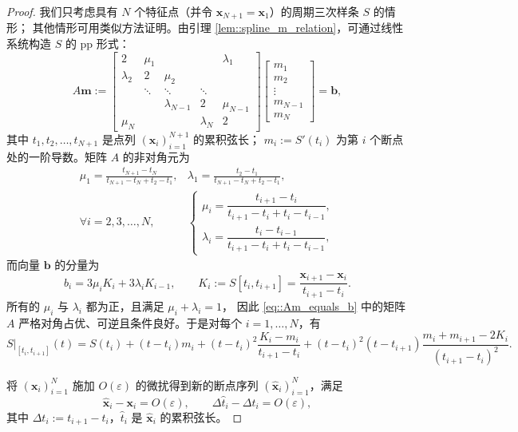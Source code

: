 \documentclass[a4paper]{ctexart}
\numberwithin{theorem}{section}
\numberwithin{equation}{section}
\numberwithin{figure}{section}
\numberwithin{remark}{section}
\begin{document}
\begin{proof}
我们只考虑具有 $N$ 个特征点（并令 $\mathbf{x}_{N+1}=\mathbf{x}_1$）的周期三次样条 $S$ 的情形；
其他情形可用类似方法证明。由引理 \ref{lem::spline_m_relation}，可通过线性系统构造 $S$ 的 pp 形式：
\begin{equation}
    \label{eq::Am_equals_b} 
A\mathbf{m}:=
\begin{bmatrix}
2 & \mu_1 &        &        & \lambda_1 \\
\lambda_2 & 2 & \mu_2 \\
 & \ddots & \ddots & \ddots \\
 &        & \lambda_{N-1} & 2 & \mu_{N-1} \\
\mu_N &     &        & \lambda_N & 2
\end{bmatrix}
\begin{bmatrix}
m_1 \\ m_2 \\ \vdots \\ m_{N-1} \\ m_N
\end{bmatrix}
=\mathbf{b},
\end{equation}
其中 $t_1,t_2,\ldots,t_{N+1}$ 是点列 $(\mathbf{x}_i)_{i=1}^{N+1}$ 的累积弦长；
$m_i:=S'(t_i)$ 为第 $i$ 个断点处的一阶导数。矩阵 $A$ 的非对角元为
\[
\begin{aligned}
\mu_1=\frac{t_{N+1}-t_N}{t_{N+1}-t_N+t_2-t_1},
& \lambda_1=\frac{t_2-t_1}{t_{N+1}-t_N+t_2-t_1},\\
\forall i=2,3,\ldots,N,\ 
& \begin{cases}
\mu_i=\dfrac{t_{i+1}-t_i}{t_{i+1}-t_i+t_i-t_{i-1}},\\[6pt]
\lambda_i=\dfrac{t_i-t_{i-1}}{t_{i+1}-t_i+t_i-t_{i-1}},
\end{cases}
\end{aligned}
\]
而向量 $\mathbf{b}$ 的分量为
\[
b_i=3\mu_i K_i+3\lambda_i K_{i-1},\qquad
K_i:=S[t_i,t_{i+1}]=\frac{\mathbf{x}_{i+1}-\mathbf{x}_i}{t_{i+1}-t_i}.
\]
所有的 $\mu_i$ 与 $\lambda_i$ 都为正，且满足 $\mu_i+\lambda_i=1$，
因此 \eqref{eq::Am_equals_b} 中的矩阵 $A$ 严格对角占优、可逆且条件良好。于是对每个 $i=1,\ldots,N$，有
\begin{equation}
    \label{eq::pp_piece} 
S\big|_{[t_i,t_{i+1}]}(t)
=
S(t_i)
+(t-t_i)m_i
+(t-t_i)^2\frac{K_i-m_i}{t_{i+1}-t_i}
+(t-t_i)^2(t-t_{i+1})\frac{m_i+m_{i+1}-2K_i}{(t_{i+1}-t_i)^2}.
\end{equation}

将 $(\mathbf{x}_i)_{i=1}^{N}$ 施加 $O(\varepsilon)$ 
的微扰得到新的断点序列 $(\hat{\mathbf{x}}_i)_{i=1}^{N}$，满足
\begin{equation}
    \label{eq::xi_perturb} 
\hat{\mathbf{x}}_i-\mathbf{x}_i=O(\varepsilon),\qquad
\Delta\hat{t}_i-\Delta t_i=O(\varepsilon),
\end{equation}
其中 $\Delta t_i:=t_{i+1}-t_i$，$\hat{t}_i$ 是 $\hat{\mathbf{x}}_i$ 的累积弦长。


\end{proof}
\end{document}
